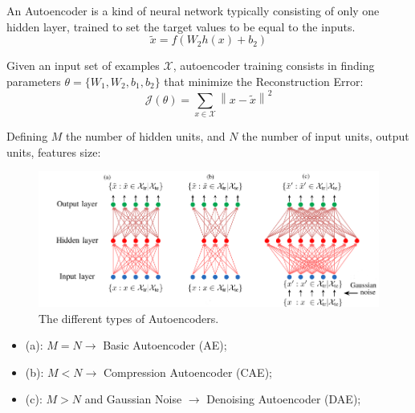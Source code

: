 %



An Autoencoder is a kind of neural network typically consisting of only one hidden layer, trained to set the target values to be equal to the inputs.
\begin{equation} %
  \tilde{x} = f(W_{2}h(x) +b_{2})
\end{equation}
 


Given an input set of examples $\mathcal{X}$, autoencoder training consists
in finding parameters $\theta=\{W_{1},W_{2},b_{1},b_{2}\}$ that
minimize the Reconstruction Error:
\begin{equation}\label{eq:obAE}
  \mathcal{J}(\theta)=\sum_{x\in{\mathcal{X}}}\left\| x - \tilde{x}\right\|^{2}
\end{equation}

Defining $M$ the number of hidden units, and $N$ the number of input units, output units, features size:

\begin{figure}
\centering
\includegraphics[width=\columnwidth]{img/autoencoders}
\caption{The different types of Autoencoders.}
\label{fig:backg:dnn:AE}
\end{figure}

\begin{itemize}
\item (a):  $M=N \rightarrow$ Basic Autoencoder (AE);
\item (b):  $M<N \rightarrow$ Compression Autoencoder (CAE);
\item (c):  $M>N$ and Gaussian Noise $\rightarrow$ Denoising Autoencoder (DAE);
\end{itemize}


